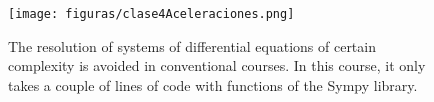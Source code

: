 \begin{figure}[!ht]
\centering
\texttt{[image: figuras/clase4Aceleraciones.png]}
\caption{The resolution of systems of differential equations of certain complexity is avoided in conventional courses. In this course, it only takes a couple of lines of code with functions of the Sympy library.}
\label{fig:clase4ac}
\end{figure}









